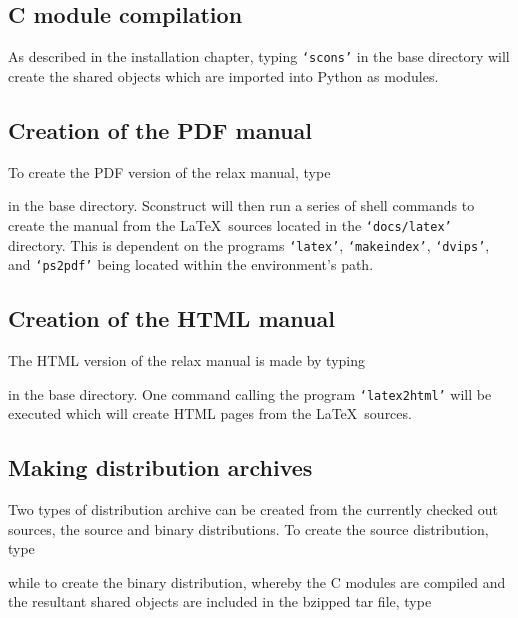 \subsection{C module compilation}

As described in the installation chapter, typing \texttt{`scons'} in the base directory will create the shared objects which are imported into Python as modules.


\subsection{Creation of the PDF manual}

To create the PDF version of the relax manual, type


in the base directory.  Sconstruct will then run a series of shell commands to create the manual from the \LaTeX\ sources located in the \texttt{`docs/latex'} directory.  This is dependent on the programs \texttt{`latex'}, \texttt{`makeindex'}, \texttt{`dvips'}, and \texttt{`ps2pdf'} being located within the environment's path.


\subsection{Creation of the HTML manual}

The HTML version of the relax manual is made by typing


in the base directory.  One command calling the program \texttt{`latex2html'} will be executed which will create HTML pages from the \LaTeX\ sources.


\subsection{Making distribution archives}

Two types of distribution archive can be created from the currently checked out sources, the source and binary distributions.  To create the source distribution, type 


while to create the binary distribution, whereby the C modules are compiled and the resultant shared objects are included in the bzipped tar file, type

